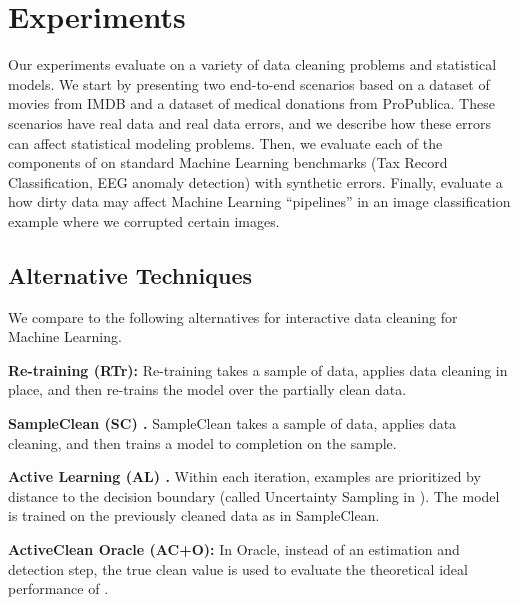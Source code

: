 \section{Experiments}\label{eval}
Our experiments evaluate \sys on a variety of data cleaning problems and statistical models.
We start by presenting two end-to-end scenarios based on a dataset of movies from IMDB and a dataset of medical donations from ProPublica.
These scenarios have real data and real data errors, and we describe how these errors can affect statistical modeling problems.
Then, we evaluate each of the components of \sys on standard Machine Learning benchmarks (Tax Record Classification, EEG anomaly detection) with synthetic errors.
Finally, evaluate a how dirty data may affect Machine Learning ``pipelines'' in an image classification example where we corrupted certain images.

\subsection{Alternative Techniques}
We compare \sys to the following alternatives for interactive data cleaning for Machine Learning.

\vspace{0.25em}

\noindent\textbf{Re-training (RTr): } Re-training takes a sample of data, applies data cleaning in place, and then re-trains the model over the partially clean data. 

\vspace{0.25em}

\noindent\textbf{SampleClean (SC) \cite{wang1999sample}. } SampleClean takes a sample of data, applies data cleaning, and then trains a model to completion on the sample.

\vspace{0.25em}

\noindent\textbf{Active Learning (AL) \cite{guillory2009active}. }
Within each iteration, examples are prioritized by distance to the decision boundary (called Uncertainty Sampling in \cite{settles2010active}).
The model is trained on the previously cleaned data as in SampleClean.


\vspace{0.25em}

\noindent\textbf{ActiveClean Oracle (AC+O): } In \sys Oracle, instead of an estimation and detection step, the true clean value is used to evaluate the theoretical ideal performance of \sys.

